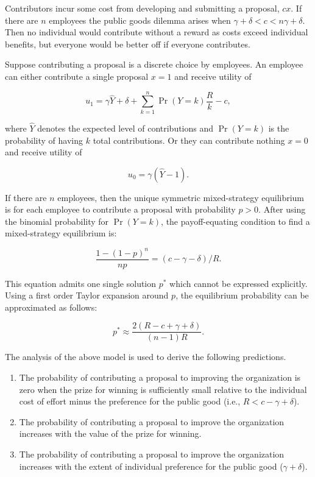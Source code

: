 \documentclass[11pt]{article}
\begin{document}
Contributors incur some cost from developing and submitting a proposal,
\(c x\). If there are \(n\) employees the public goods dilemma arises
when \(\gamma+\delta < c < n\gamma+\delta\). Then no individual would
contribute without a reward as costs exceed individual benefits, but
everyone would be better off if everyone contributes.

Suppose contributing a proposal is a discrete choice by employees. An
employee can either contribute a single proposal \(x=1\) and receive
utility of

\begin{equation}
    u_1 = \gamma \hat Y + \delta + \sum_{k=1}^{n}\Pr(Y=k)\frac{R}{k}  - c, 
\end{equation}

where \(\hat Y\) denotes the expected level of contributions and
\(\Pr(Y=k)\) is the probability of having \(k\) total contributions. Or
they can contribute nothing \(x=0\) and receive utility of

\begin{equation}
  u_0 = \gamma (\hat Y - 1).
\end{equation}

If there are \(n\) employees, then the unique symmetric mixed-strategy
equilibrium is for each employee to contribute a proposal with
probability \(p>0\). After using the binomial probability for
\(\Pr(Y=k)\), the payoff-equating condition to find a mixed-strategy
equilibrium is:

\begin{equation} \label{eq: mixed-strategy}
  \frac{1- (1-p)^{n}}{n p} = (c- \gamma - \delta) / R.
\end{equation}

This equation admits one single solution \(p^*\) which cannot be
expressed explicitly. Using a first order Taylor expansion around \(p\),
the equilibrium probability can be approximated as follows:

\begin{equation} \label{eq: probability}
  p^*  \approx \frac{2 (R- c+\gamma +\delta )}{(n-1) R}. 
\end{equation}

The analysis of the above model is used to derive the following
predictions.

\begin{enumerate}
\def\labelenumi{\arabic{enumi})}
\item
  The probability of contributing a proposal to improving the
  organization is zero when the prize for winning is sufficiently small
  relative to the individual cost of effort minus the preference for the
  public good (i.e., \(R< c-\gamma +\delta\)).
\item
  The probability of contributing a proposal to improve the organization
  increases with the value of the prize for winning.
\item
  The probability of contributing a proposal to improve the organization
  increases with the extent of individual preference for the public good
  (\(\gamma+\delta\)).
\end{enumerate}
\end{document}
